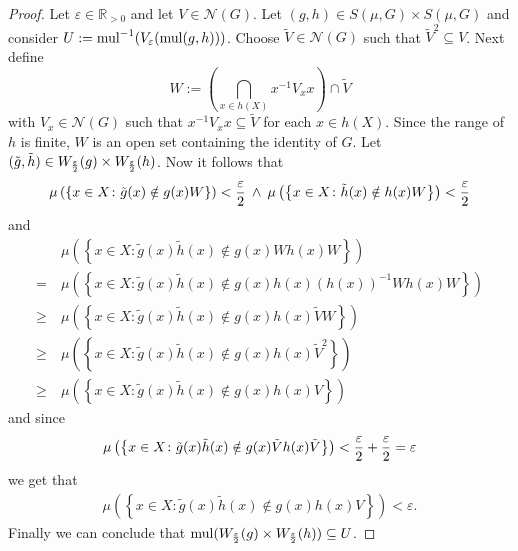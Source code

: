 \begin{proof}
  Let $\varepsilon \in \mathbb{R}_{>0}$ and let $V \in \mathcal{N}(G)$. Let $(g,h) \in S(\mu, G) \times S(\mu, G)$ and consider $U := {\rm mul}^{-1}(V_\varepsilon({\rm mul}(g,h)))$. Choose $\tilde{V} \in \mathcal{N}(G)$ such that $\tilde{V}^2 \subseteq V$. Next define \[W := \left(\bigcap\limits_{x\in h(X)} x^{-1}V_xx \right) \cap \tilde{V}\] with $V_x\in \mathcal{N}(G)$ such that $x^{-1}V_xx \subseteq \tilde{V}$ for each $x \in h(X)$. Since the range of $h$ is finite, $W$ is an open set containing the identity of $G$. Let $(\tilde{g}, \tilde{h})\in W_{\varepsilon\over 2}(g) \times W_{\varepsilon \over 2}(h)$. Now it follows that
  \begin{align*}
    \mu\left(\left\{x\in X\colon \tilde{g}(x) \notin g(x)W\right\}\right) < {\varepsilon\over 2} \: \land \: 
    \mu\left(\left\{x\in X\colon \tilde{h}(x) \notin h(x)W\right\}\right) < {\varepsilon \over 2}
  \end{align*}
  and 
  \begin{align*}
    &\mu\left(\left\{x \in X\colon \tilde{g}(x)\tilde{h}(x) \notin g(x)Wh(x)W \right\}\right) \\
    = \:&\mu\left(\left\{x \in X\colon \tilde{g}(x)\tilde{h}(x) \notin g(x)h(x)(h(x))^{-1}Wh(x)W \right\}\right) \\
    \geq \:&\mu\left(\left\{x \in X\colon \tilde{g}(x)\tilde{h}(x) \notin g(x)h(x)\tilde{V}W \right\}\right) \\
    \geq \:&\mu\left(\left\{x \in X\colon \tilde{g}(x)\tilde{h}(x) \notin g(x)h(x)\tilde{V}^2 \right\}\right) \\
    \geq \:&\mu\left(\left\{x \in X\colon \tilde{g}(x)\tilde{h}(x) \notin g(x)h(x)V \right\}\right) 
  \end{align*}
  and since
  \begin{align*}
    \mu\left(\left\{x \in X\colon \tilde{g}(x)\tilde{h}(x) \notin g(x)\tilde{V}h(x)\tilde{V} \right\}\right) < {\varepsilon\over 2} + {\varepsilon\over 2} = \varepsilon
  \end{align*}
  we get that
  \begin{align*}
    \mu\left(\left\{x \in X\colon \tilde{g}(x)\tilde{h}(x) \notin g(x)h(x)V \right\}\right) < \varepsilon. 
  \end{align*}
  Finally we can conclude that ${\rm mul}(W_{\varepsilon \over 2}(g) \times W_{\varepsilon \over 2}(h)) \subseteq U$.


\end{proof}
